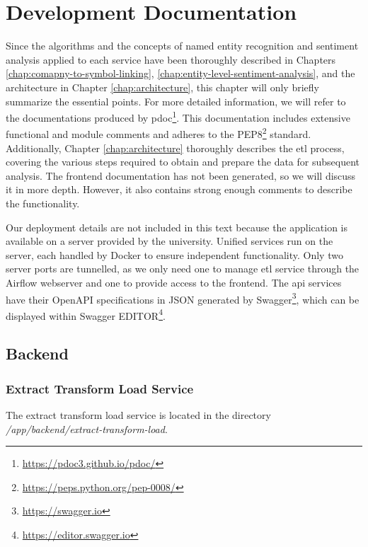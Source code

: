 \chapter{Development Documentation}
\label{chap:development-documentation}
Since the algorithms and the concepts of named entity recognition and sentiment analysis applied to each service have been thoroughly described in Chapters \ref{chap:comapny-to-symbol-linking}, \ref{chap:entity-level-sentiment-analysis}, and the architecture in Chapter \ref{chap:architecture}, this chapter will only briefly summarize the essential points. For more detailed information, we will refer to the documentations produced by pdoc\footnote{\href{https://pdoc3.github.io/pdoc/}{https://pdoc3.github.io/pdoc/}}. This documentation includes extensive functional and module comments and adheres to the PEP8\footnote{\href{https://peps.python.org/pep-0008/}{https://peps.python.org/pep-0008/}} standard. Additionally, Chapter \ref{chap:architecture} thoroughly describes the \acrshort{etl} process, covering the various steps required to obtain and prepare the data for subsequent analysis. The frontend documentation has not been generated, so we will discuss it in more depth. However, it also contains strong enough comments to describe the functionality.

Our deployment details are not included in this text because the application is available on a server provided by the university. Unified services run on the server, each handled by Docker to ensure independent functionality. Only two server ports are tunnelled, as we only need one to manage \acrshort{etl} service through the Airflow webserver and one to provide access to the frontend. The \acrshort{api} services have their OpenAPI specifications in JSON generated by Swagger\footnote{\href{https://swagger.io}{https://swagger.io}}, which can be displayed within Swagger EDITOR\footnote{\href{https://editor.swagger.io}{https://editor.swagger.io}}.

\section{Backend}
\label{sec:development-backend}

\subsection{Extract Transform Load Service}
\label{subsec:development-etl}
The extract transform load service is located in the directory \textit{/app/backend/extract-transform-load}.

